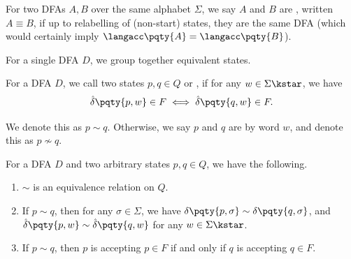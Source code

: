 \begin{definition}
    For two DFAs \(A, B\) over the same alphabet \(\Sigma\), we say \(A\) and \(B\) are , written \(A \equiv B\), if up to relabelling of (non-start) states, they are the same DFA (which would certainly imply \(\langacc\pqty{A} = \langacc\pqty{B}\)).
\end{definition}

For a single DFA \(D\), we group together equivalent states.

\begin{definition}
    For a DFA \(D\), we call two states \(p, q \in Q\)  or , if for any \(w \in \Sigma\kstar\), we have
    \[
        \hat{\delta}\pqty{p, w} \in F \iff \hat{\delta}\pqty{q, w} \in F.
    \]

    We denote this as \(p \sim q\). Otherwise, we say \(p\) and \(q\) are  by word \(w\), and denote this as \(p \nsim q\).
\end{definition}

\begin{proposition}
    \label{prop:equivalence-of-states}%
    For a DFA \(D\) and two arbitrary states \(p, q \in Q\), we have the following.

    \begin{enumerate}
        \item \(\sim\) is an equivalence relation on \(Q\).
        \item If \(p \sim q\), then for any \(\sigma \in \Sigma\), we have \(\delta\pqty{p, \sigma} \sim \delta\pqty{q, \sigma}\), and \(\hat{\delta}\pqty{p, w} \sim \hat{\delta}\pqty{q, w}\) for any \(w \in \Sigma\kstar\).
        \item If \(p \sim q\), then \(p\) is accepting \(p \in F\) if and only if \(q\) is accepting \(q \in F\).
    \end{enumerate}
\end{proposition}

